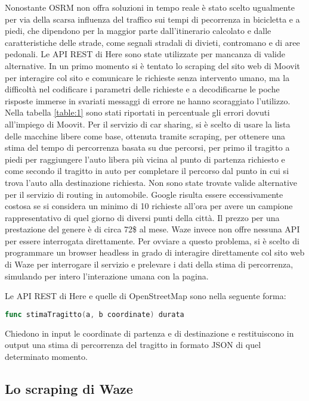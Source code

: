 Nonostante OSRM non offra soluzioni in tempo reale è stato scelto ugualmente per via della scarsa influenza del traffico sui tempi di pecorrenza in bicicletta e a piedi, che dipendono per la maggior parte dall'itinerario calcolato e dalle caratteristiche delle strade, come segnali stradali di divieti, contromano e di aree pedonali. Le API REST di Here sono state utilizzate per mancanza di valide alternative. In un primo momento si è tentato lo scraping del sito web di Moovit per interagire col sito e comunicare le richieste senza intervento umano, ma la difficoltà nel codificare i parametri delle richieste e a decodificarne le poche risposte immerse in svariati messaggi di errore ne hanno scoraggiato l'utilizzo. Nella tabella \ref{table:1} sono stati riportati in percentuale gli errori dovuti all'impiego di Moovit. Per il servizio di car sharing, si è scelto di usare la lista delle macchine libere come base, ottenuta tramite scraping, per ottenere una stima del tempo di percorrenza basata su due percorsi, per primo il tragitto a piedi per raggiungere l'auto libera più vicina al punto di partenza richiesto e come secondo il tragitto in auto per completare il percorso dal punto in cui si trova l'auto alla destinazione richiesta. Non sono state trovate valide alternative per il servizio di routing in automobile. Google risulta essere eccessivamente costosa se si considera un minimo di 10 richieste all'ora per avere un campione rappresentativo di quel giorno di diversi punti della città. Il prezzo per una prestazione del genere è di circa 72\$ al mese. Waze invece non offre nessuna API per essere interrogata direttamente. Per ovviare a questo problema, si è scelto di programmare un browser headless in grado di interagire direttamente col sito web di Waze per interrogare il servizio e prelevare i dati della stima di percorrenza, simulando per intero l'interazione umana con la pagina.

Le API REST di Here e quelle di OpenStreetMap sono nella seguente forma:

\begin{lstlisting}[language=Go]
func stimaTragitto(a, b coordinate) durata
\end{lstlisting}

Chiedono in input le coordinate di partenza e di destinazione e restituiscono in output una stima di percorrenza del tragitto in formato JSON di quel determinato momento.

\subsection{Lo scraping di Waze}

